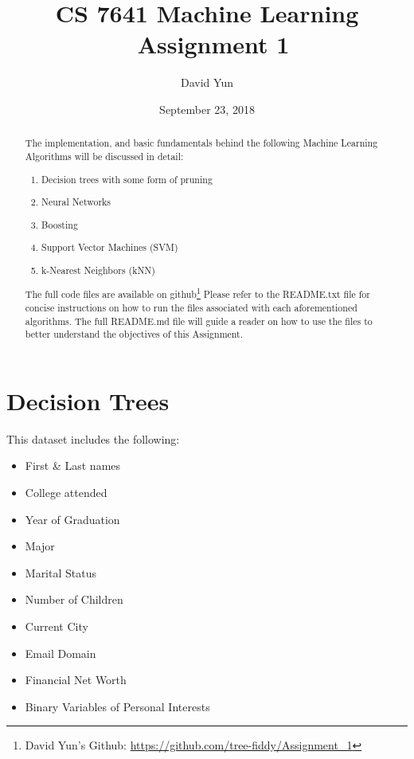 \documentclass[letterpaper,12pt]{article}
\begin{document}
\title{CS 7641 Machine Learning \\
		\ Assignment 1 }
\author{David Yun}
\date{September 23, 2018}
\maketitle

\begin{abstract}
  The implementation, and basic fundamentals behind the following Machine Learning Algorithms will be discussed in detail:  
  \begin{enumerate}
    \item Decision trees with some form of pruning
    \item Neural Networks
    \item Boosting
    \item Support Vector Machines (SVM)
    \item k-Nearest Neighbors (kNN)
      
    \end{enumerate}

    The full code files are available on github\footnote{David Yun's Github: \url{https://github.com/tree-fiddy/Assignment_1}}
    Please refer to the README.txt file for concise instructions on how to run the files associated with each aforementioned algorithms.  The full README.md file will guide a reader on how to use the files to better understand the objectives of this Assignment.  

\end{abstract}

\tableofcontents

\section{Decision Trees}
This dataset includes the following:

\begin{itemize}
\item First \& Last names
\item College attended
\item Year of Graduation
\item Major
\item Marital Status
\item Number of Children
\item Current City
\item Email Domain
\item Financial Net Worth
\item Binary Variables of Personal Interests
\end{itemize}
\end{document}
